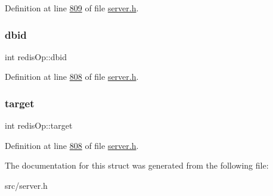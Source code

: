 Definition at line \hyperlink{server_8h_source_l00809}{809} of file \hyperlink{server_8h_source}{server.\+h}.

\mbox{\label{structredisOp_a0bb6d12ef020e7d31c041455526a880e}} 
\subsubsection{\texorpdfstring{dbid}{dbid}}
{\footnotesize\ttfamily int redis\+Op\+::dbid}



Definition at line \hyperlink{server_8h_source_l00808}{808} of file \hyperlink{server_8h_source}{server.\+h}.

\mbox{\label{structredisOp_a98c8d1ace5a01739c2fe478357779221}} 
\subsubsection{\texorpdfstring{target}{target}}
{\footnotesize\ttfamily int redis\+Op\+::target}



Definition at line \hyperlink{server_8h_source_l00808}{808} of file \hyperlink{server_8h_source}{server.\+h}.



The documentation for this struct was generated from the following file\+:\begin{DoxyCompactItemize}
\item 
src/server.\+h\end{DoxyCompactItemize}
